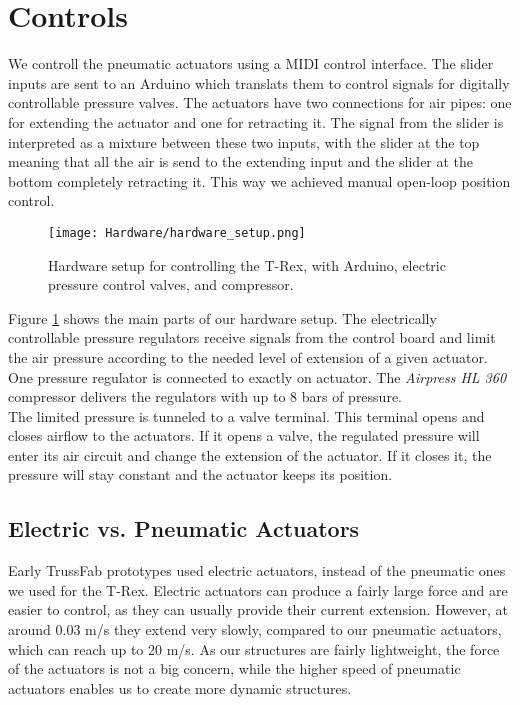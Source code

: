\section{Controls}
We controll the pneumatic actuators using a MIDI control interface. The slider inputs are sent to an Arduino which translats them to control signals for digitally controllable pressure valves. The actuators have two connections for air pipes: one for extending the actuator and one for retracting it. The signal from the slider is interpreted as a mixture between these two inputs, with the slider at the top meaning that all the air is send to the extending input and the slider at the bottom completely retracting it. This way we achieved manual open-loop position control.\\
\begin{figure}[h!]
    \texttt{[image: Hardware/hardware\_setup.png]}
    \centering
    \caption{Hardware setup for controlling the T-Rex, with Arduino, electric pressure control valves, and compressor.}
    \label{fig:hardware_setup}
\end{figure}
Figure \ref{fig:hardware_setup} shows the main parts of our hardware setup. The electrically controllable pressure regulators receive signals from the control board and limit the air pressure according to the needed level of extension of a given actuator. One pressure regulator is connected to exactly on actuator. The \textit{Airpress HL 360} compressor delivers the regulators with up to 8 bars of pressure.\\
The limited pressure is tunneled to a valve terminal. This terminal opens and closes airflow to the actuators. If it opens a valve, the regulated pressure will enter its air circuit and change the extension of the actuator. If it closes it, the pressure will stay constant and the actuator keeps its position.

\subsection{Electric vs. Pneumatic Actuators}
Early TrussFab prototypes used electric actuators, instead of the pneumatic ones we used for the T-Rex. Electric actuators can produce a fairly large force and are easier to control, as they can usually provide their current extension. However, at around 0.03 m/s they extend very slowly, compared to our pneumatic actuators, which can reach up to 20 m/s. As our structures are fairly lightweight, the force of the actuators is not a big concern, while the higher speed of pneumatic actuators enables us to create more dynamic structures.


